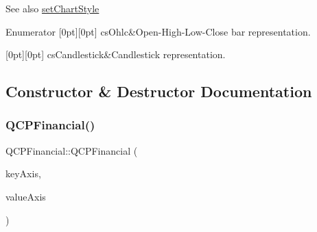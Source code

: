 \begin{DoxySeeAlso}{See also}
\mbox{\hyperlink{class_q_c_p_financial_a5a59175d36279d71596e64d7bb65596f}{set\+Chart\+Style}} 
\end{DoxySeeAlso}
\begin{DoxyEnumFields}{Enumerator}
[0pt][0pt]{}\mbox{\label{class_q_c_p_financial_a0f800e21ee98d646dfc6f8f89d10ebfba3a516016c9298d3e95dd82aa203c4390}} 
cs\+Ohlc&Open-\/\+High-\/\+Low-\/\+Close bar representation. \\
\hline

[0pt][0pt]{}\mbox{\label{class_q_c_p_financial_a0f800e21ee98d646dfc6f8f89d10ebfbac803cbd39f26e3f206bcc7028679e62f}} 
cs\+Candlestick&Candlestick representation. \\
\hline

\end{DoxyEnumFields}


\subsection{Constructor \& Destructor Documentation}
\mbox{\label{class_q_c_p_financial_a4702d5248feeb9d1ec6e3ce725b10b32}} 
\subsubsection{\texorpdfstring{Q\+C\+P\+Financial()}{QCPFinancial()}}
{\footnotesize\ttfamily Q\+C\+P\+Financial\+::\+Q\+C\+P\+Financial (\begin{DoxyParamCaption}\item[{\mbox{\hyperlink{class_q_c_p_axis}{Q\+C\+P\+Axis}} $\ast$}]{key\+Axis,  }\item[{\mbox{\hyperlink{class_q_c_p_axis}{Q\+C\+P\+Axis}} $\ast$}]{value\+Axis }\end{DoxyParamCaption})\hspace{0.3cm}{\ttfamily [explicit]}}

